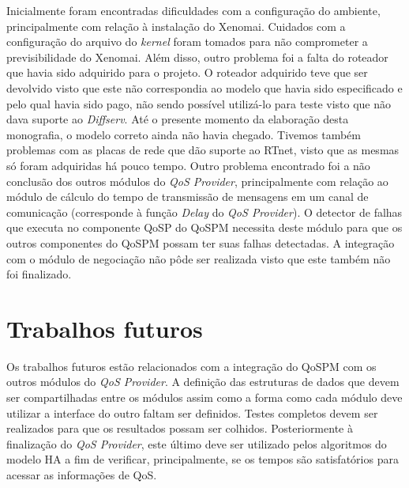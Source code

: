 	Inicialmente foram encontradas dificuldades com a configuração do ambiente, principalmente com relação à instalação do Xenomai. Cuidados com a configuração do arquivo do \textit{kernel} foram tomados para não comprometer a previsibilidade do Xenomai. Além disso, outro problema foi a falta do roteador que havia sido adquirido para o projeto. O roteador adquirido teve que ser devolvido visto que este não correspondia ao modelo que havia sido especificado e pelo qual havia sido pago, não sendo possível utilizá-lo para teste visto que não dava suporte ao \textit{Diffserv}. Até o presente momento da elaboração desta monografia, o modelo correto ainda não havia chegado. Tivemos também problemas com as placas de rede que dão suporte ao RTnet, visto que as mesmas só foram adquiridas há pouco tempo. Outro problema encontrado foi a não conclusão dos outros módulos do \textit{QoS Provider}, principalmente com relação ao módulo de cálculo do tempo de transmissão de mensagens em um canal de comunicação (corresponde à função \textit{Delay} do \textit{QoS Provider}). O detector de falhas que executa no componente QoSP do QoSPM necessita deste módulo para que os outros componentes do QoSPM possam ter suas falhas detectadas. A integração com o módulo de negociação não pôde ser realizada visto que este também não foi finalizado.
	
\section{Trabalhos futuros}

	Os trabalhos futuros estão relacionados com a integração do QoSPM com os outros módulos do \textit{QoS Provider}. A definição das estruturas de dados que devem ser compartilhadas entre os módulos assim como a forma como cada módulo deve utilizar a interface do outro faltam ser definidos. Testes completos devem ser realizados para que os resultados possam ser colhidos. Posteriormente à finalização do \textit{QoS Provider}, este último deve ser utilizado pelos algoritmos do modelo HA a fim de verificar, principalmente, se os tempos são satisfatórios para acessar as informações de QoS.